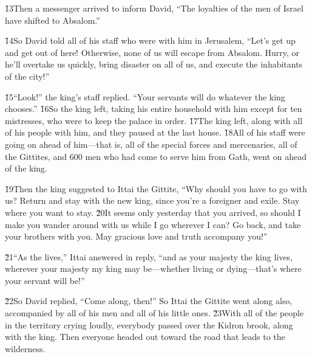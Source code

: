 \v{13}Then a messenger arrived to inform David, ``The loyalties of the men of Israel have shifted to Absalom.''

\v{14}So David told all of his staff who were with him in Jerusalem, ``Let's get up and get out of here! Otherwise, none of us will escape from Absalom. Hurry, or he'll overtake us quickly, bring disaster on all of us, and execute the inhabitants of the city!''

\v{15}``Look!'' the king's staff replied. ``Your servants will do whatever the king chooses.'' \v{16}So the king left, taking his entire household with him except for ten mistresses, who were to keep the palace in order. \v{17}The king left, along with all of his people with him, and they paused at the last house. \v{18}All of his staff were going on ahead of him---that is, all of the special forces and mercenaries, all of the Gittites, and 600 men who had come to serve him from Gath, went on ahead of the king.

\v{19}Then the king suggested to Ittai the Gittite, ``Why should you have to go with us? Return and stay with the new king, since you're a foreigner and exile. Stay where you want to stay. \v{20}It seems only yesterday that you arrived, so should I make you wander around with us while I go wherever I can? Go back, and take your brothers with you. May gracious love and truth accompany you!''

\v{21}``As the  lives,'' Ittai answered in reply, ``and as your majesty the king lives, wherever your majesty my king may be---whether living or dying---that's where your servant will be!''

\v{22}So David replied, ``Come along, then!'' So Ittai the Gittite went along also, accompanied by all of his men and all of his little ones. \v{23}With all of the people in the territory crying loudly, everybody passed over the Kidron brook, along with the king. Then everyone headed out toward the road that leads to the wilderness.

